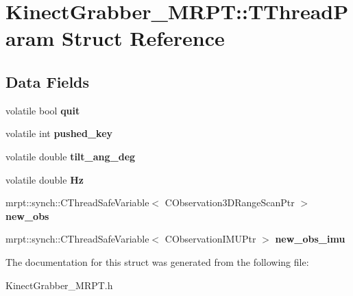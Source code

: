 \hypertarget{struct_kinect_grabber___m_r_p_t_1_1_t_thread_param}{
\section{KinectGrabber\_\-MRPT::TThreadParam Struct Reference}
\label{struct_kinect_grabber___m_r_p_t_1_1_t_thread_param}
}
\subsection*{Data Fields}
\begin{DoxyCompactItemize}
\item 
\hypertarget{struct_kinect_grabber___m_r_p_t_1_1_t_thread_param_a498162673751ccf387f5c9ddcf4d9812}{
volatile bool {\bfseries quit}}
\label{struct_kinect_grabber___m_r_p_t_1_1_t_thread_param_a498162673751ccf387f5c9ddcf4d9812}

\item 
\hypertarget{struct_kinect_grabber___m_r_p_t_1_1_t_thread_param_a9ef42273f5f6ac0e1b8741d7b9875a38}{
volatile int {\bfseries pushed\_\-key}}
\label{struct_kinect_grabber___m_r_p_t_1_1_t_thread_param_a9ef42273f5f6ac0e1b8741d7b9875a38}

\item 
\hypertarget{struct_kinect_grabber___m_r_p_t_1_1_t_thread_param_a30eb58aadbfa1a861955776e37e6b509}{
volatile double {\bfseries tilt\_\-ang\_\-deg}}
\label{struct_kinect_grabber___m_r_p_t_1_1_t_thread_param_a30eb58aadbfa1a861955776e37e6b509}

\item 
\hypertarget{struct_kinect_grabber___m_r_p_t_1_1_t_thread_param_a0a01691754dd95a575b7eaa614a33498}{
volatile double {\bfseries Hz}}
\label{struct_kinect_grabber___m_r_p_t_1_1_t_thread_param_a0a01691754dd95a575b7eaa614a33498}

\item 
\hypertarget{struct_kinect_grabber___m_r_p_t_1_1_t_thread_param_abb407ff1abba227249f6efea5adc78aa}{
mrpt::synch::CThreadSafeVariable$<$ CObservation3DRangeScanPtr $>$ {\bfseries new\_\-obs}}
\label{struct_kinect_grabber___m_r_p_t_1_1_t_thread_param_abb407ff1abba227249f6efea5adc78aa}

\item 
\hypertarget{struct_kinect_grabber___m_r_p_t_1_1_t_thread_param_a020c5c2516b0731ba2f7604642bcba65}{
mrpt::synch::CThreadSafeVariable$<$ CObservationIMUPtr $>$ {\bfseries new\_\-obs\_\-imu}}
\label{struct_kinect_grabber___m_r_p_t_1_1_t_thread_param_a020c5c2516b0731ba2f7604642bcba65}

\end{DoxyCompactItemize}


The documentation for this struct was generated from the following file:\begin{DoxyCompactItemize}
\item 
KinectGrabber\_\-MRPT.h\end{DoxyCompactItemize}
